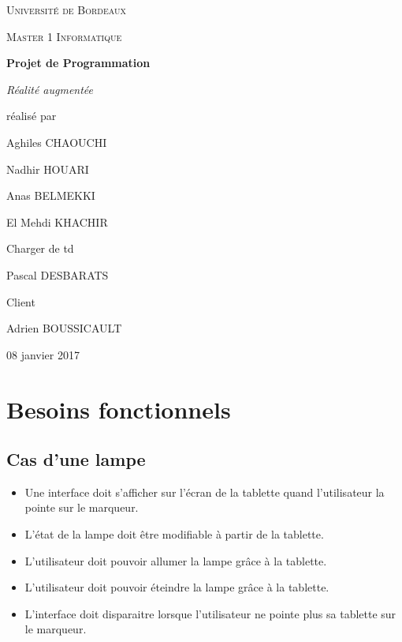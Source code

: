 \documentclass[12pt,a4paper]{article}
\begin{document}
\begin{titlepage}
\centering
{\scshape\LARGE Université de Bordeaux \par}
{\scshape\Large Master 1 Informatique \par}
\vspace{3cm}

{\Huge\bfseries Projet de Programmation \par}%
\vspace{0.5cm}
{\Large\itshape Réalité augmentée \par}

\vfill
réalisé par \par
Aghiles \textsc{CHAOUCHI} \par
Nadhir \textsc{HOUARI} \par
Anas \textsc{BELMEKKI} \par
El Mehdi \textsc{KHACHIR} \par \par
Charger de td \par
Pascal \textsc{DESBARATS} \par \par
Client \par
Adrien \textsc{BOUSSICAULT} \par
\vfill

{\large 08 janvier 2017\par}

\end{titlepage}

\section{Besoins fonctionnels}
\subsection{Cas d'une lampe}

\begin{itemize}
  \item Une interface doit s'afficher sur l'écran de la tablette quand l'utilisateur la pointe sur le marqueur.
  \item L'état de la lampe doit être modifiable à partir de la tablette.
  \item L'utilisateur doit pouvoir allumer la lampe grâce à la tablette.
  \item L'utilisateur doit pouvoir éteindre la lampe grâce à la tablette.
  \item L'interface doit disparaitre lorsque l'utilisateur ne pointe plus sa tablette sur le marqueur.
\end{itemize}
\end{document}
